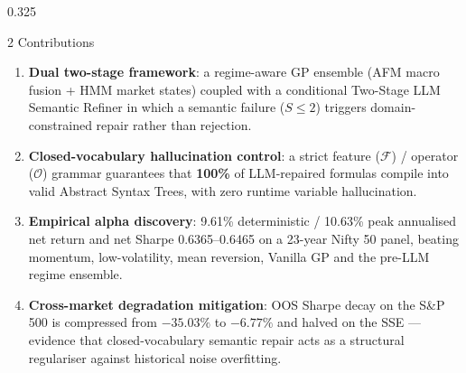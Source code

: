 \documentclass[final]{beamer}
\newcommand{\hl}[1]{\textbf{\color{navy2}#1}}
\newcommand{\gd}[1]{\textbf{\color{good}#1}}
\begin{document}
\begin{frame}[t]{}
\begin{columns}[t]
\begin{column}{0.325\textwidth}
\begin{block}{2 \; Contributions}
\begin{enumerate}
  \item \hl{Dual two-stage framework}: a regime-aware GP ensemble (AFM macro fusion + HMM market states) coupled with a conditional Two-Stage LLM Semantic Refiner in which a semantic failure ($S \leq 2$) triggers domain-constrained repair rather than rejection.
  \item \hl{Closed-vocabulary hallucination control}: a strict feature ($\mathcal{F}$) / operator ($\mathcal{O}$) grammar guarantees that \gd{100\%} of LLM-repaired formulas compile into valid Abstract Syntax Trees, with zero runtime variable hallucination.
  \item \hl{Empirical alpha discovery}: 9.61\% deterministic / 10.63\% peak annualised net return and net Sharpe 0.6365--0.6465 on a 23-year Nifty 50 panel, beating momentum, low-volatility, mean reversion, Vanilla GP and the pre-LLM regime ensemble.
  \item \hl{Cross-market degradation mitigation}: OOS Sharpe decay on the S\&P 500 is compressed from $-35.03\%$ to $-6.77\%$ and halved on the SSE --- evidence that closed-vocabulary semantic repair acts as a structural regulariser against historical noise overfitting.
\end{enumerate}
\end{block}


\end{column}
\end{columns}
\end{frame}
\end{document}
